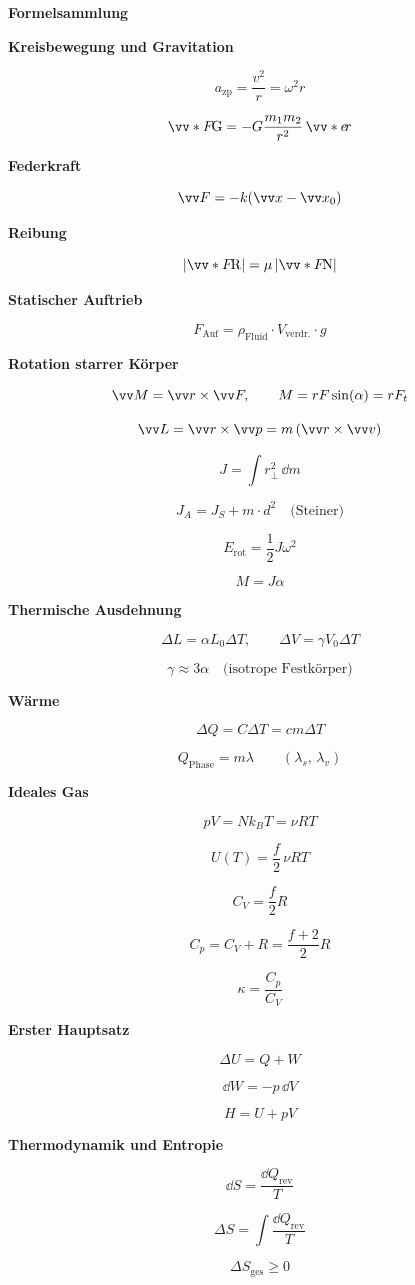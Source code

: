 \documentclass[10pt,a4paper,landscape]{article}
\newcommand{\fssection}[1]{%
  \vspace{0.2em}%
  {\bfseries #1}\par
  \vspace{0.2em}%
}
\newcommand{\fseq}[1]{%
  \[
    #1
  \]
  \vspace{-0.4em}%
}
\begin{document}
\footnotesize

\begin{center}
    {\Large \textbf{Formelsammlung}}\\[-0.1em]
\end{center}

\vspace{-0.5em}

\begin{multicols}{3}

\fssection{Kreisbewegung und Gravitation}
\fseq{a_{\mathrm{zp}} = \frac{v^2}{r} = \omega^2 r}
\fseq{\ivecS{F}{\mathrm{G}} = -G\frac{m_1 m_2}{r^2}\,\ivecS{e}{r}}

\fssection{Federkraft}
\fseq{\ivec{F} = -k (\ivec{x}-\ivec{x}_0)}

\fssection{Reibung}
\fseq{|\ivecS{F}{\mathrm{R}}| = \mu\,|\ivecS{F}{\mathrm{N}}|}

\fssection{Statischer Auftrieb}
\fseq{F_{\mathrm{Auf}} = \rho_{\mathrm{Fluid}} \cdot V_{\mathrm{verdr.}} \cdot g}

\fssection{Rotation starrer Körper}
\fseq{\ivec{M} = \ivec{r} \times \ivec{F}, \qquad M = rF\sin(\alpha) = rF_t}
\fseq{\ivec{L} = \ivec{r} \times \ivec{p} = m\,(\ivec{r} \times \ivec{v})}
\fseq{J = \int r_\perp^2\,\dd m}
\fseq{J_A = J_S + m\cdot d^2 \quad \text{(Steiner)}}
\fseq{E_{\mathrm{rot}} = \frac{1}{2}J\omega^2}
\fseq{M = J\alpha}

\columnbreak

\fssection{Thermische Ausdehnung}
\fseq{\Delta L = \alpha L_0\Delta T, \qquad \Delta V = \gamma V_0\Delta T}
\fseq{\gamma \approx 3\alpha \quad \text{(isotrope Festkörper)}}
\fssection{Wärme}
\fseq{\Delta Q = C\Delta T = c m\Delta T}
\fseq{Q_{\mathrm{Phase}} = m\lambda \qquad (\lambda_s,\,\lambda_v)}

\fssection{Ideales Gas}
\fseq{pV = Nk_B T = \nu RT}
\fseq{U(T) = \frac{f}{2}\,\nu RT}
\fseq{C_V = \frac{f}{2}R}
\fseq{C_p = C_V + R = \frac{f+2}{2}R}
\fseq{\kappa = \frac{C_p}{C_V}}

\fssection{Erster Hauptsatz}
\fseq{\Delta U = Q + W}
\fseq{\dd W = -p\,\dd V}
\fseq{H = U + pV}


\columnbreak

\fssection{Thermodynamik und Entropie}
\fseq{\dd S = \frac{\dd Q_{\mathrm{rev}}}{T}}
\fseq{\Delta S = \int \frac{\dd Q_{\mathrm{rev}}}{T}}
\fseq{\Delta S_{\mathrm{ges}} \ge 0}


\end{multicols}
\end{document}
